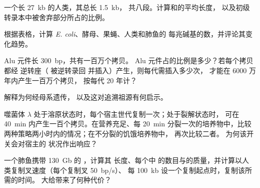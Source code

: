 \begin{exercise}[$\star\star$]\label{exo:b1:genomes:6}
一个长 \qty{27}{kb} 的人类，其总长 \qty{1.5}{kb}，
共八段。计算和的平均长度，
以及初级转录本中被舍弃部分所占的比例。
\end{exercise}

\begin{exercise}[$\star\star$]\label{exo:b1:genomes:7}
根据表格，计算 \emph{E. coli}、酵母、果蝇、人类和肺鱼的
每兆碱基的数，并评论其变化趋势。
\end{exercise}

\begin{exercise}[$\star\star$]\label{exo:b1:genomes:8}
Alu 元件长 \qty{300}{bp}，共有一百万个拷贝。
Alu 元件占的比例是多少？若每个拷贝都经
逆转座（ 被逆转录回  并插入）产生，则每代需插入多少次，
才能在 6000 万年内产生一百万个拷贝，
按每代 \num{20} 年计？
\end{exercise}

\begin{exercise}[$\star\star$]\label{exo:b1:genomes:9}
解释为何经母系遗传，
以及这对追溯祖源有何启示。
\end{exercise}

\begin{exercise}[$\star\star\star$]\label{exo:b1:genomes:10}
噬菌体 $\lambda$ 处于溶原状态时，每个宿主世代复制一次；处于裂解状态时，
可在 \qty{40}{min} 内产生一百个拷贝。在营养充足、每 \qty{20}{min}
分裂一次的培养物中，比较两种策略两小时内的情况；在不分裂的饥饿培养物中，
再次比较二者。
为何该开关会对宿主的
状况作出响应？
\end{exercise}

\begin{exercise}[$\star\star\star$]\label{exo:b1:genomes:11}
一个肺鱼携带 \qty{130}{Gb} 的 ，计算其  长度、每个中
的数目与的质量，并计算以人类复制叉速度（每个复制叉 \qty{50}{bp/s}）、
每 \qty{100}{kb} 设一个复制起点时，复制该所需的时间。
大给带来了何种代价？
\end{exercise}


